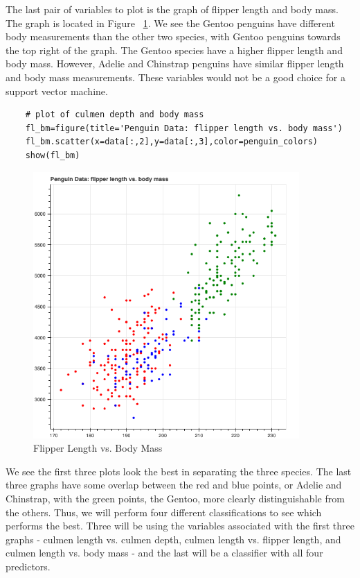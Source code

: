 \documentclass[12pt]{article}
\begin{document}
The last pair of variables to plot is the graph of flipper length and body mass. The graph is located in Figure ~\ref{fig_fl_bm}. We see the Gentoo penguins have different body measurements than the other two species, with Gentoo penguins towards the top right of the graph. The Gentoo species have a higher flipper length and body mass. However, Adelie and Chinstrap penguins have similar flipper length and body mass measurements. These variables would not be a good choice for a support vector machine.

\begin{verbatim}
    # plot of culmen depth and body mass
    fl_bm=figure(title='Penguin Data: flipper length vs. body mass')
    fl_bm.scatter(x=data[:,2],y=data[:,3],color=penguin_colors)
    show(fl_bm)
\end{verbatim}

\begin{figure}[H]
    \centering
    \includegraphics[width=4in]{Figures/penguins/fl_bm.png}
    \caption{Flipper Length vs. Body Mass}
    \label{fig_fl_bm}
\end{figure}

We see the first three plots look the best in separating the three species. The last three graphs have some overlap between the red and blue points, or Adelie and Chinstrap, with the green points, the Gentoo, more clearly distinguishable from the others. Thus, we will perform four different classifications to see which performs the best. Three will be using the variables associated with the first three graphs - culmen length vs. culmen depth, culmen length vs. flipper length, and culmen length vs. body mass - and the last will be a classifier with all four predictors.
\end{document}
